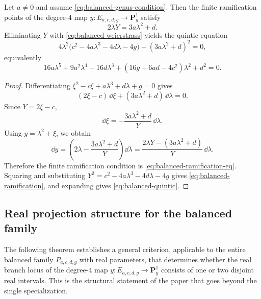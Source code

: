 \begin{corollary}\label{cor:balanced-ramification}
Let \(a\neq 0\) and assume \eqref{eq:balanced-genus-condition}.
Then the finite ramification points of the degree-\(4\) map \(y:E_{a,c,d,g}\to\mathbf P^1_y\) satisfy
\begin{equation}\label{eq:balanced-ramification-eq}
2\lambda Y=3a\lambda^2+d.
\end{equation}
Eliminating \(Y\) with \eqref{eq:balanced-weierstrass} yields the quintic equation
\begin{equation}\label{eq:balanced-ramification}
4\lambda^2\bigl(c^2-4a\lambda^3-4d\lambda-4g\bigr)-(3a\lambda^2+d)^2=0,
\end{equation}
equivalently
\begin{equation}\label{eq:balanced-quintic}
16a\lambda^5+9a^2\lambda^4+16d\lambda^3+(16g+6ad-4c^2)\lambda^2+d^2=0.
\end{equation}
\end{corollary}

\begin{proof}
Differentiating \(\xi^2-c\xi+a\lambda^3+d\lambda+g=0\) gives
\[
(2\xi-c)\,\dd\xi+(3a\lambda^2+d)\,\dd\lambda=0.
\]
Since \(Y=2\xi-c\),
\[
\dd\xi=-\frac{3a\lambda^2+d}{Y}\,\dd\lambda.
\]
Using \(y=\lambda^2+\xi\), we obtain
\[
\dd y
=
\left(2\lambda-\frac{3a\lambda^2+d}{Y}\right)\dd\lambda
=
\frac{2\lambda Y-(3a\lambda^2+d)}{Y}\,\dd\lambda.
\]
Therefore the finite ramification condition is \eqref{eq:balanced-ramification-eq}.
Squaring and substituting \(Y^2=c^2-4a\lambda^3-4d\lambda-4g\) gives \eqref{eq:balanced-ramification}, and expanding gives \eqref{eq:balanced-quintic}.
\end{proof}

\subsection{Real projection structure for the balanced family}

The following theorem establishes a general criterion, applicable to the entire balanced family \(P_{a,c,d,g}\) with real parameters, that determines whether the real branch locus of the degree-\(4\) map $y:E_{a,c,d,g}\to\mathbf P^1_y$ consists of one or two disjoint real intervals.
This is the structural statement of the paper that goes beyond the single specialization.

